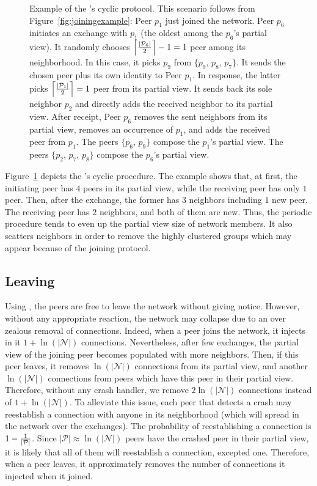 \begin{figure}
  \centering
  
  \caption{\label{fig:cyclicexample}Example of the \SCAMPLON{}'s cyclic
    protocol. This scenario follows from Figure~\ref{fig:joiningexample}: Peer
    $p_1$ just joined the network. Peer $p_6$ initiates an exchange with $p_1$
    (the oldest among the $p_6$'s partial view). It randomly chooses
    $\left\lceil{|\mathcal{P}_6|\over{2}}\right\rceil-1 = 1$ peer among its
    neighborhood. In this case, it picks $p_9$ from $\{p_9,\,p_8,\,p_7\}$.  It
    sends the chosen peer plus its own identity to Peer $p_1$. In response, the
    latter picks $\left\lceil{|\mathcal{P}_1|\over{2}}\right\rceil = 1$ peer
    from its partial view. It sends back its sole neighbor $p_2$ and directly
    adds the received neighbor to its partial view. After receipt, Peer $p_6$
    removes the sent neighbors from its partial view, removes an occurrence of
    $p_1$, and adds the received peer from $p_1$. The peers $\{p_6,\,p_9\}$
    compose the $p_1$'s partial view. The peers $\{p_2,\,p_7,\,p_8\}$ compose
    the $p_6$'s partial view.}
\end{figure}

Figure~\ref{fig:cyclicexample} depicts the \SCAMPLON{}'s cyclic procedure. The
example shows that, at first, the initiating peer has $4$ peers in its partial
view, while the receiving peer has only $1$ peer. Then, after the exchange, the
former has $3$ neighbors including $1$ new peer. The receiving peer has $2$
neighbors, and both of them are new. Thus, the periodic procedure tends to
even up the partial view size of network members. It also scatters neighbors in
order to remove the highly clustered groups which may appear because of the
joining protocol.

\subsection{Leaving}
\label{subsec:leaving}

Using \SCAMPLON{}, the peers are free to leave the network without giving
notice. However, without any appropriate reaction, the network may collapse due
to an over zealous removal of connections. Indeed, when a peer joins the
network, it injects in it $1+\ln(|\mathcal{N}|)$ connections. Nevertheless,
after few exchanges, the partial view of the joining peer becomes populated
with more neighbors. Then, if this peer leaves, it removes $\ln(|\mathcal{N}|)$
connections from its partial view, and another $\ln(|\mathcal{N}|)$ connections
from peers which have this peer in their partial view. Therefore, without any
crash handler, we remove $2\ln(|\mathcal{N}|)$ connections instead of
$1+\ln(|\mathcal{N}|)$. To alleviate this issue, each peer that detects a crash
may reestablish a connection with anyone in its neighborhood (which will spread
in the network over the exchanges). The probability of reestablishing a
connection is $1-{1\over{|\mathcal{P}|}}$. Since
${|\mathcal{P}|}\approx \ln(|\mathcal{N}|)$ peers have the crashed peer in
their partial view, it is likely that all of them will reestablish a
connection, excepted one. Therefore, when a peer leaves, it approximately
removes the number of connections it injected when it joined.

